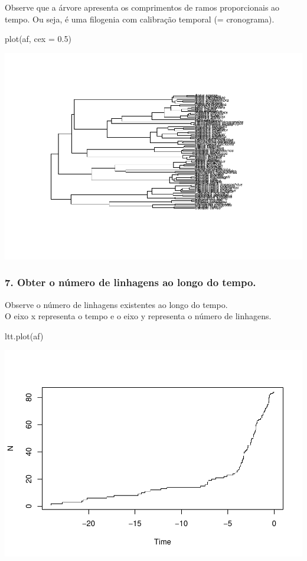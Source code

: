 \documentclass[
]{article}
\newenvironment{Shaded}{\begin{snugshade}}{\end{snugshade}}
\newcommand{\AttributeTok}[1]{\textcolor[rgb]{0.77,0.63,0.00}{#1}}
\newcommand{\FloatTok}[1]{\textcolor[rgb]{0.00,0.00,0.81}{#1}}
\newcommand{\FunctionTok}[1]{\textcolor[rgb]{0.00,0.00,0.00}{#1}}
\newcommand{\NormalTok}[1]{#1}
\begin{document}
Observe que a árvore apresenta os comprimentos de ramos proporcionais ao
tempo. Ou seja, é uma filogenia com calibração temporal (= cronograma).

\begin{Shaded}
\begin{Highlighting}[]
\FunctionTok{plot}\NormalTok{(af, }\AttributeTok{cex =} \FloatTok{0.5}\NormalTok{)}
\end{Highlighting}
\end{Shaded}

\includegraphics{ex14_files/figure-latex/unnamed-chunk-5-1.pdf}

\hypertarget{obter-o-nuxfamero-de-linhagens-ao-longo-do-tempo.}{%
\subsubsection{7. Obter o número de linhagens ao longo do
tempo.}\label{obter-o-nuxfamero-de-linhagens-ao-longo-do-tempo.}}

Observe o número de linhagens existentes ao longo do tempo.\\
O eixo x representa o tempo e o eixo y representa o número de linhagens.

\begin{Shaded}
\begin{Highlighting}[]
\FunctionTok{ltt.plot}\NormalTok{(af)}
\end{Highlighting}
\end{Shaded}

\includegraphics{ex14_files/figure-latex/unnamed-chunk-6-1.pdf}
\end{document}
